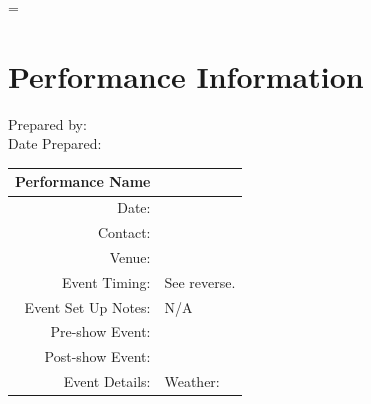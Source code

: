 \usepackage{coolertitles}   %
\usepackage{npage}			%

\graphicspath{{./}}     %

\usepackage[pdfusetitle]{hyperref}   %

\title{\myTitle}
\author{\myAuthor}
\date{\specialdate\today}

\pagestyle{fancy}
\renewcommand{\headrulewidth}{0pt} %
\fancyhead[]{ }
\fancyfoot{ }

\emergencystretch=\maxdimen
{}

\titlenew				%
\pagenumbers			%
\thispagestyle{fancy}	%
\hypersetup{linkcolor=blue} %
\flushleft
{} %

\section{Performance Information}
Prepared by: \myAuthor{} \\
Date Prepared: \todo{}

\begin{table}[h]
	\begin{tabular}{|r|l|}
		\hline Performance Name & \showName{} \\
		\hline Date: & \showDate{} \\
		\hline Contact: & \showContact{} \\
		\hline Venue: & \showVenue{} \\
		\hline Event Timing: & See reverse. \\
		\hline Event Set Up Notes: & N/A \\
		\hline Pre-show Event: & \showPreEvent{} \\
		\hline Post-show Event: & \showPostEvent{} \\
		\hline Event Details: & Weather: \weather{} \\
		\hline
	\end{tabular}
\end{table}

